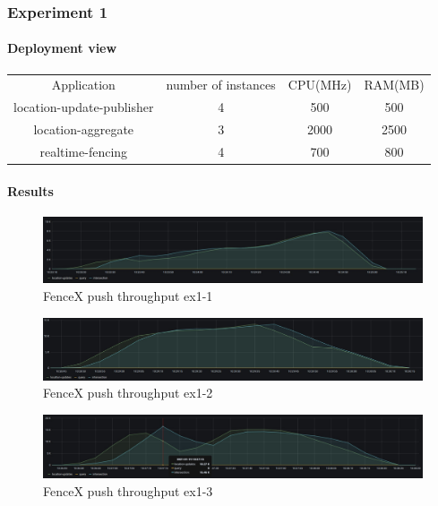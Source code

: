 \documentclass[a4]{report}
\begin{document}
    \subsubsection{Experiment 1}
    \paragraph{Deployment view}
    \begin{center}
        \begin{tabular}{ c c c c }
            Application               &  number of instances     & CPU(MHz)  & RAM(MB)    \\
            location-update-publisher &          4               & 500       &   500      \\
            location-aggregate        &          3               & 2000      &   2500     \\
            realtime-fencing          &          4               & 700       &   800      \\
        \end{tabular}
    \end{center}

    \paragraph{Results}
    \begin{figure}[ht]
        \caption{FenceX push throughput ex1-1}
        \label{fig:ex1-1}
        \includegraphics[scale=0.4]{images/evaluation/ex1-benchmarking(15,6).png}
    \end{figure}

    \begin{figure}[ht]
        \caption{FenceX push throughput ex1-2}
        \label{fig:ex1-2}
        \includegraphics[scale=0.4]{images/evaluation/ex1-benchmarking(19,7).png}
    \end{figure}

    \begin{figure}[ht]
        \caption{FenceX push throughput ex1-3}
        \label{fig:ex1-3}
        \includegraphics[scale=0.4]{images/evaluation/ex1-benchmarking(22,9).png}
    \end{figure}
\end{document}
